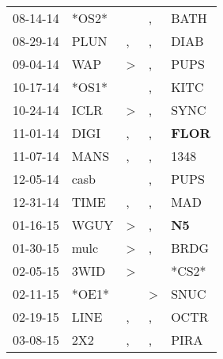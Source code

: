 \begin{supertabular}{p{0.07\textwidth}p{0.06\textwidth}p{0.02\textwidth}p{0.02\textwidth}p{0.06\textwidth}}
          08-14-14\textsuperscript{} &                            *OS2* &                  &             , &           BATH\textsuperscript{} \\
          08-29-14\textsuperscript{} &           PLUN\textsuperscript{} &                , &             , &           DIAB\textsuperscript{} \\
          09-04-14\textsuperscript{} &            WAP\textsuperscript{} &     \textgreater &             , &           PUPS\textsuperscript{} \\
          10-17-14\textsuperscript{} &                            *OS1* &                  &             , &           KITC\textsuperscript{} \\
          10-24-14\textsuperscript{} &           ICLR\textsuperscript{} &     \textgreater &             , &           SYNC\textsuperscript{} \\
          11-01-14\textsuperscript{} &           DIGI\textsuperscript{} &                , &             , &  \textbf{FLOR\textsuperscript{}} \\
          11-07-14\textsuperscript{} &           MANS\textsuperscript{} &                , &             , &           1348\textsuperscript{} \\
          12-05-14\textsuperscript{} &           casb\textsuperscript{} &                  &             , &           PUPS\textsuperscript{} \\
          12-31-14\textsuperscript{} &           TIME\textsuperscript{} &                , &             , &            MAD\textsuperscript{} \\
          01-16-15\textsuperscript{} &           WGUY\textsuperscript{} &     \textgreater &             , &    \textbf{N5\textsuperscript{}} \\
          01-30-15\textsuperscript{} &           mulc\textsuperscript{} &     \textgreater &             , &           BRDG\textsuperscript{} \\
          02-05-15\textsuperscript{} &           3WID\textsuperscript{} &     \textgreater &               &                            *CS2* \\
          02-11-15\textsuperscript{} &                            *OE1* &                  &  \textgreater &           SNUC\textsuperscript{} \\
          02-19-15\textsuperscript{} &           LINE\textsuperscript{} &                , &             , &           OCTR\textsuperscript{} \\
          03-08-15\textsuperscript{} &            2X2\textsuperscript{} &                , &             , &           PIRA\textsuperscript{} \\

\end{supertabular}
